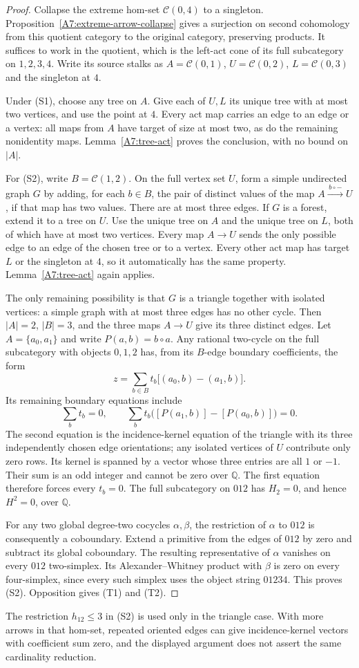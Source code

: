 \begin{proof}
Collapse the extreme hom-set $\mathcal C(0,4)$ to a singleton.
Proposition~\ref{A7:extreme-arrow-collapse} gives a surjection
on second cohomology from this quotient category to the
original category, preserving products. It suffices to work
in the quotient, which is the left-act cone of its full
subcategory on $1,2,3,4$. Write its source stalks as
$A=\mathcal C(0,1)$, $U=\mathcal C(0,2)$,
$L=\mathcal C(0,3)$ and the singleton at $4$.

Under (S1), choose any tree on $A$. Give each of $U,L$ its
unique tree with at most two vertices, and use the point at
$4$. Every act map carries an edge to an edge or a vertex:
all maps from $A$ have target of size at most two, as do the
remaining nonidentity maps. Lemma~\ref{A7:tree-act} proves
the conclusion, with no bound on $|A|$.

For (S2), write $B=\mathcal C(1,2)$. On the full vertex set
$U$, form a simple undirected graph $G$ by adding, for
each $b\in B$, the pair of distinct values of the map
$A\xrightarrow{\,b\circ-\,}U$, if that map has two values.
There are at most three edges. If $G$ is a forest, extend it
to a tree on $U$. Use the unique tree on $A$ and the unique
tree on $L$, both of which have at most two vertices.
Every map $A\to U$ sends the only possible edge to an edge
of the chosen tree or to a vertex. Every other act map has
target $L$ or the singleton at $4$, so it automatically has
the same property. Lemma~\ref{A7:tree-act} again applies.

The only remaining possibility is that $G$ is a triangle
together with isolated vertices: a simple graph with at
most three edges has no other cycle.
Then $|A|=2$, $|B|=3$, and the three maps $A\to U$ give its
three distinct edges. Let $A=\{a_0,a_1\}$ and write
$P(a,b)=b\circ a$. Any rational two-cycle on the full
subcategory with objects $0,1,2$ has, from its $B$-edge
boundary coefficients, the form
\[
 z=\sum_{b\in B}t_b\bigl[(a_0,b)-(a_1,b)\bigr].
\]
Its remaining boundary equations include
\[
 \sum_b t_b=0,
 \qquad
 \sum_b t_b\bigl([P(a_1,b)]-[P(a_0,b)]\bigr)=0.
\]
The second equation is the incidence-kernel equation of
the triangle with its three independently chosen edge
orientations; any isolated vertices of $U$ contribute
only zero rows. Its kernel is spanned by a vector whose
three entries are all $1$ or $-1$. Their sum is an odd
integer and cannot be zero over $\mathbb Q$. The first
equation therefore forces every $t_b=0$. The full
subcategory on $012$ has $H_2=0$, and hence $H^2=0$,
over $\mathbb Q$.

For any two global degree-two cocycles $\alpha,\beta$,
the restriction of $\alpha$ to $012$ is consequently a
coboundary. Extend a primitive from the edges of $012$
by zero and subtract its global coboundary. The resulting
representative of $\alpha$ vanishes on every $012$
two-simplex. Its Alexander--Whitney product with $\beta$
is zero on every four-simplex, since every such simplex
uses the object string $01234$. This proves (S2).
Opposition gives (T1) and (T2).
\end{proof}

\begin{remark*}
The restriction $h_{12}\leq3$ in (S2) is used only in
the triangle case. With more arrows in that hom-set,
repeated oriented edges can give incidence-kernel vectors
with coefficient sum zero, and the displayed argument
does not assert the same cardinality reduction.
\end{remark*}
